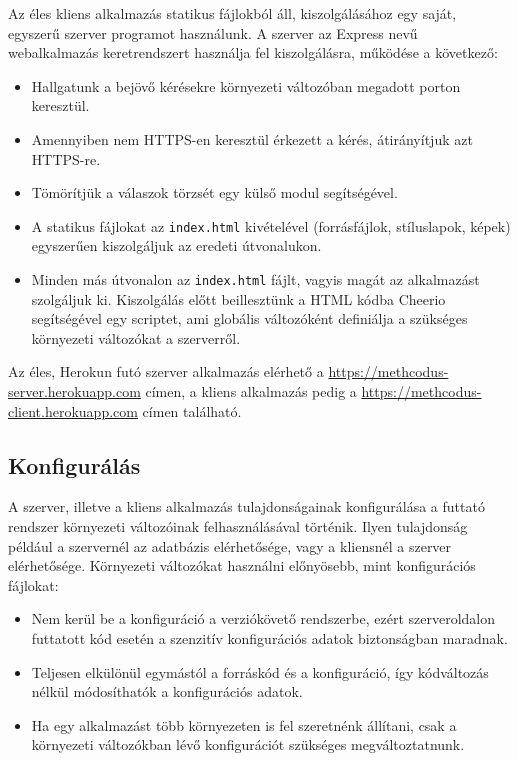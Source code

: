 \documentclass{elteikthesis}
\begin{document}
        Az éles kliens alkalmazás statikus fájlokból áll, kiszolgálásához egy saját, egyszerű szerver programot használunk. A szerver az Express nevű webalkalmazás keretrendszert használja fel kiszolgálásra, működése a következő:
        \begin{itemize}
          \setlength\itemsep{-0.5em}
          \item Hallgatunk a bejövő kérésekre környezeti változóban megadott porton keresztül.
          \item Amennyiben nem HTTPS-en keresztül érkezett a kérés, átirányítjuk azt HTTPS-re.
          \item Tömörítjük a válaszok törzsét egy külső modul segítségével.
          \item A statikus fájlokat az \texttt{index.html} kivételével (forrásfájlok, stíluslapok, képek) egyszerűen kiszolgáljuk az eredeti útvonalukon.
          \item Minden más útvonalon az \texttt{index.html} fájlt, vagyis magát az alkalmazást szolgáljuk ki. Kiszolgálás előtt beillesztünk a HTML kódba Cheerio segítségével egy scriptet, ami globális változóként definiálja a szükséges környezeti változókat a szerverről.
        \end{itemize}

        Az éles, Herokun futó szerver alkalmazás elérhető a \url{https://methcodus-server.herokuapp.com} címen, a kliens alkalmazás pedig a \url{https://methcodus-client.herokuapp.com} címen található.

			\subsection{Konfigurálás}
				A szerver, illetve a kliens alkalmazás tulajdonságainak konfigurálása a futtató rendszer környezeti változóinak felhasználásával történik. Ilyen tulajdonság például a szervernél az adatbázis elérhetősége, vagy a kliensnél a szerver elérhetősége. Környezeti változókat használni előnyösebb, mint konfigurációs fájlokat:
				\begin{itemize}
					\setlength\itemsep{-0.5em}
					\item Nem kerül be a konfiguráció a verziókövető rendszerbe, ezért szerveroldalon futtatott kód esetén a szenzitív konfigurációs adatok biztonságban maradnak.
					\item Teljesen elkülönül egymástól a forráskód és a konfiguráció, így kódváltozás nélkül módosíthatók a konfigurációs adatok.
					\item Ha egy alkalmazást több környezeten is fel szeretnénk állítani, csak a környezeti változókban lévő konfigurációt szükséges megváltoztatnunk.
				\end{itemize}
\end{document}
